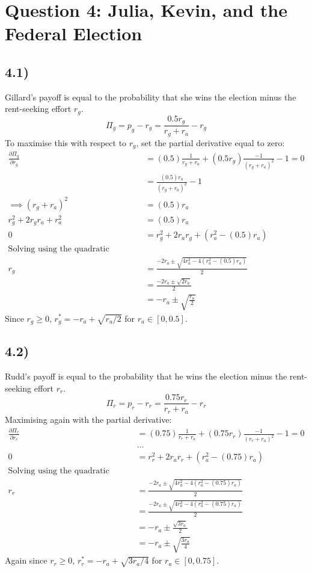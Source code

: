 \documentclass{article}
\begin{document}
\section*{Question 4: Julia, Kevin, and the Federal Election}
\subsection*{4.1)}
Gillard's payoff is equal to the probability that she wins the election minus the rent-seeking effort $r_{g}$.
$$\Pi_{g} = p_{g} - r_{g} = \frac{0.5 r_{g}}{r_{g} + r_{a}} - r_{g}$$
To maximise this with respect to $r_{g}$, set the partial derivative equal to zero:
\begin{align*}
    \frac{\partial \Pi_{g}}{\partial r_{g}} &= (0.5)\frac{1}{r_{g} + r_{a}} + (0.5 r_{g})\frac{-1}{(r_{g} + r_{a})^2} - 1 = 0\\
    &= \frac{(0.5)r_{a}}{(r_{g} + r_{a})^{2}} - 1\\
    \implies (r_{g} + r_{a})^{2} &= (0.5)r_{a}\\
    r_{g}^2 + 2r_{g}r_{a} + r_{a}^2 &= (0.5)r_{a}\\
    0 &= r_{g}^2 + 2r_{a}r_{g} + (r_{a}^2 - (0.5)r_{a})\\
    \mbox{Solving using the quadratic formula:}\\
    r_{g} &= \frac{-2 r_{a} \pm \sqrt{4 r_{a}^{2} - 4(r_{a}^2 - (0.5)r_{a})}}{2}\\
    &= \frac{-2 r_{a} \pm \sqrt{2 r_{a}}}{2}\\
    &= -r_{a} \pm \sqrt{\frac{r_{a}}{2}}
\end{align*}
Since $r_{g} \geq 0$, $r_{g}^{*} = -r_{a} + \sqrt{{r_{a}}/{2}}$ for $r_{a} \in [0, 0.5]$.

\subsection*{4.2)}
Rudd's payoff is equal to the probability that he wins the election minus the rent-seeking effort $r_{r}$.
$$\Pi_{r} = p_{r} - r_{r} = \frac{0.75 r_{r}}{r_{r} + r_{a}} - r_{r}$$
Maximising again with the partial derivative:
\begin{align*}
    \frac{\partial \Pi_{r}}{\partial r_{r}} &= (0.75)\frac{1}{r_{r} + r_{a}} + (0.75 r_{r})\frac{-1}{(r_{r} + r_{a})^2} - 1 = 0\\
    &\dots\\
    0 &= r_{r}^2 + 2r_{a}r_{r} + (r_{a}^2 - (0.75)r_{a})\\
    \mbox{Solving using the quadratic formula:}\\
    r_{r} &= \frac{-2 r_{a} \pm \sqrt{4 r_{a}^{2} - 4(r_{a}^2 - (0.75)r_{a})}}{2}\\
    &= \frac{-2 r_{a} \pm \sqrt{4 r_{a}^{2} - 4(r_{a}^2 - (0.75)r_{a})}}{2}\\
    &= -r_{a} \pm \frac{\sqrt{3 r_{a}}}{2}\\
    &= -r_{a} \pm \sqrt{\frac{3 r_{a}}{4}}
\end{align*}
Again since $r_{r} \geq 0$, $r_{r}^{*} = -r_{a} + \sqrt{{3 r_{a}}/{4}}$ for $r_{a} \in [0, 0.75]$.
\end{document}
